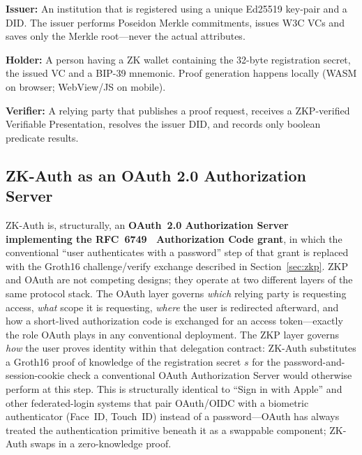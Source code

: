 \documentclass[journal,twoside,10pt]{IEEEtran}
\begin{document}
\textbf{Issuer:} An institution that is registered using a unique Ed25519 key-pair and a DID. The issuer performs Poseidon Merkle commitments, issues W3C VCs and saves only the Merkle root---never the actual attributes.

\textbf{Holder:} A person having a ZK wallet containing the 32-byte registration secret, the issued VC and a BIP-39 mnemonic. Proof generation happens locally (WASM on browser; WebView/JS on mobile).

\textbf{Verifier:} A relying party that publishes a proof request, receives
a ZKP-verified Verifiable Presentation, resolves the issuer DID, and records
only boolean predicate results.

\subsection{ZK-Auth as an OAuth 2.0 Authorization Server}
\label{sec:oauth_zkp}

ZK-Auth is, structurally, an \textbf{OAuth~2.0 Authorization Server
implementing the RFC~6749~\cite{oauth2} Authorization Code grant}, in
which the conventional ``user authenticates with a password'' step of
that grant is replaced with the Groth16 challenge/verify exchange
described in Section~\ref{sec:zkp}. ZKP and OAuth are not competing
designs; they operate at two different layers of the same protocol
stack. The OAuth layer governs \textit{which} relying party is
requesting access, \textit{what} scope it is requesting, \textit{where}
the user is redirected afterward, and how a short-lived authorization
code is exchanged for an access token---exactly the role OAuth plays in
any conventional deployment. The ZKP layer governs \textit{how} the
user proves identity within that delegation contract: ZK-Auth
substitutes a Groth16 proof of knowledge of the registration secret $s$
for the password-and-session-cookie check a conventional OAuth
Authorization Server would otherwise perform at this step. This is
structurally identical to ``Sign in with Apple'' and other federated-login
systems that pair OAuth/OIDC with a biometric authenticator (Face~ID,
Touch~ID) instead of a password---OAuth has always treated the
authentication primitive beneath it as a swappable component; ZK-Auth
swaps in a zero-knowledge proof.
\end{document}

